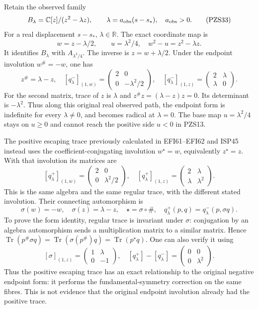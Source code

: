 \documentclass[
  10pt,
  a4paper,
]{article}
\begin{document}
Retain the observed family \[
B_\lambda=\mathbb C[z]/(z^2-\lambda z),
\qquad \lambda=a_{\rm obs}(s-s_*),\quad a_{\rm obs}>0.
\tag{PZS33}
\] For a real displacement \(s-s_*\), \(\lambda\in\mathbb R\). The exact
coordinate map is \[
w=z-\lambda/2,\qquad u=\lambda^2/4,
\quad w^2-u=z^2-\lambda z.
\tag{PZS34}
\] It identifies \(B_\lambda\) with \(A_{\lambda^2/4}\). The inverse is
\(z=w+\lambda/2\). Under the endpoint involution \(w^\#=-w\), one has \[
z^\#=\lambda-z,
\quad [q^-_\lambda]_{(1,w)}=
\begin{pmatrix}2&0\\0&-\lambda^2/2\end{pmatrix},
\quad [q^-_\lambda]_{(1,z)}=
\begin{pmatrix}2&\lambda\\\lambda&0\end{pmatrix}.
\tag{PZS35}
\] For the second matrix, trace of \(z\) is \(\lambda\) and
\(z^\#z=(\lambda-z)z=0\). Its determinant is \(-\lambda^2\). Thus along
this original real observed path, the endpoint form is indefinite for
every \(\lambda\ne0\), and becomes radical at \(\lambda=0\). The base
map \(u=\lambda^2/4\) stays on \(u\ge0\) and cannot reach the positive
side \(u<0\) in PZS13.

The positive escaping trace previously calculated in EFI61--EFI62 and
ISP45 instead uses the coefficient-conjugating involution \(w^\star=w\),
equivalently \(z^\star=z\). With that involution its matrices are \[
[q^+_\lambda]_{(1,w)}=
\begin{pmatrix}2&0\\0&\lambda^2/2\end{pmatrix},
\quad [q^+_\lambda]_{(1,z)}=
\begin{pmatrix}2&\lambda\\\lambda&\lambda^2\end{pmatrix}.
\tag{PZS36}
\] This is the same algebra and the same regular trace, with the
different stated involution. Their connecting automorphism is \[
\sigma(w)=-w,\quad\sigma(z)=\lambda-z,
\quad \star=\sigma\circ\#,
\quad q^+_\lambda(p,q)=q^-_\lambda(p,\sigma q).
\tag{PZS37}
\] To prove the form identity, regular trace is invariant under
\(\sigma\): conjugation by an algebra automorphism sends a
multiplication matrix to a similar matrix. Hence
\(\operatorname{Tr}(p^\#\sigma q)=\operatorname{Tr}(\sigma(p^\#)q)=\operatorname{Tr}(p^\star q)\).
One can also verify it using \[
[\sigma]_{(1,z)}=\begin{pmatrix}1&\lambda\\0&-1\end{pmatrix},
\quad
[q^+_\lambda]-[q^-_\lambda]
=\begin{pmatrix}0&0\\0&\lambda^2\end{pmatrix}.
\tag{PZS38}
\] Thus the positive escaping trace has an exact relationship to the
original negative endpoint form: it performs the fundamental-symmetry
correction on the same fibres. This is not evidence that the original
endpoint involution already had the positive trace.
\end{document}
